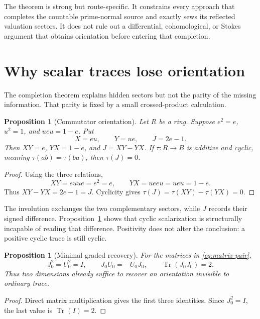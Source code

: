 \documentclass[11pt]{article}
\newtheorem{proposition}[theorem]{Proposition}
\theoremstyle{definition}
\theoremstyle{remark}
\newcommand{\Tr}{\operatorname{Tr}}
\begin{document}
The theorem is strong but route-specific.  It constrains every approach
that completes the countable prime-normal source and exactly sews its
reflected valuation sectors.  It does not rule out a differential,
cohomological, or Stokes argument that obtains orientation before entering
that completion.

\section{Why scalar traces lose orientation}
\label{sec:orientation}

The completion theorem explains hidden sectors but not the parity of the
missing information.  That parity is fixed by a small crossed-product
calculation.

\begin{proposition}[Commutator orientation]
\label{prop:commutator-orientation}
Let \(R\) be a ring.  Suppose \(e^2=e\), \(u^2=1\), and \(ueu=1-e\).
Put
\[
                         X=eu,\qquad Y=ue,
                         \qquad J=2e-1.
\]
Then \(XY=e\), \(YX=1-e\), and \(J=XY-YX\).  If
\(\tau:R\to B\) is additive and cyclic, meaning
\(\tau(ab)=\tau(ba)\), then \(\tau(J)=0\).
\end{proposition}

\begin{proof}
Using the three relations,
\[
 XY=euu e=e^2=e,
 \qquad
 YX=ueeu=ueu=1-e.
\]
Thus \(XY-YX=2e-1=J\).  Cyclicity gives
\(\tau(J)=\tau(XY)-\tau(YX)=0\).
\end{proof}

The involution exchanges the two complementary sectors, while \(J\)
records their signed difference.  Proposition~\ref{prop:commutator-orientation}
shows that cyclic scalarization is structurally incapable of reading that
difference.  Positivity does not alter the conclusion: a positive cyclic
trace is still cyclic.

\begin{proposition}[Minimal graded recovery]
\label{prop:graded-recovery}
For the matrices in \eqref{eq:matrix-pair},
\[
 J_0^2=U_0^2=I,\qquad J_0U_0=-U_0J_0,
 \qquad \Tr(J_0J_0)=2.
\tag{5.1}\label{eq:graded-detection}
\]
Thus two dimensions already suffice to recover an orientation invisible to
ordinary trace.
\end{proposition}

\begin{proof}
Direct matrix multiplication gives the first three identities.  Since
\(J_0^2=I\), the last value is \(\Tr(I)=2\).
\end{proof}
\end{document}
